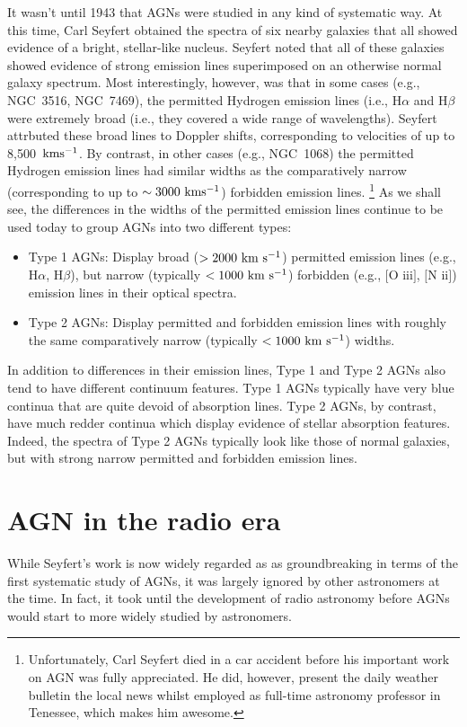 \documentclass[11pt]{article}
\begin{document}
It wasn't until 1943 that AGNs were studied in any kind of systematic
way. At this time, Carl Seyfert obtained the spectra of six nearby
galaxies that all showed evidence of a bright, stellar-like
nucleus. Seyfert noted that all of these galaxies showed evidence of
strong emission lines superimposed on an otherwise normal galaxy
spectrum. Most interestingly, however, was that in some cases (e.g.,
NGC~3516, NGC~7469), the permitted Hydrogen emission lines (i.e.,
H$\alpha$ and H$\beta$ were extremely broad (i.e., they covered a wide
range of wavelengths). Seyfert attrbuted these broad lines to Doppler
shifts, corresponding to velocities of up to 8,500~${\rm km s^{-1}}$.
By contrast, in other cases (e.g., NGC~1068) the permitted Hydrogen
emission lines had similar widths as the comparatively narrow
(corresponding to up to $\sim3000~{\rm km s^{-1}}$) forbidden emission
lines. \footnote{Unfortunately, Carl Seyfert died in a car accident
  before his important work on AGN was fully appreciated. He did,
  however, present the daily weather bulletin the local news whilst
  employed as full-time astronomy professor in Tenessee, which makes
  him awesome.}  As we shall see, the differences in the widths of the
permitted emission lines continue to be used today to group AGNs into
two different types:
\begin{itemize}
\item Type 1 AGNs: Display broad ($>2000~{\rm km~s^{-1}}$) permitted
  emission lines (e.g., H$\alpha$, H$\beta$), but narrow (typically
  $<1000~{\rm km~s^{-1}}$) forbidden (e.g., $[$O {\sc iii}$]$, $[$N
  {\sc ii}$]$) emission lines in their optical spectra.
\item Type 2 AGNs: Display permitted and forbidden emission lines with
  roughly the same comparatively narrow (typically
  $<1000~{\rm km~s^{-1}}$) widths.
\end{itemize}

In addition to differences in their emission lines, Type 1 and Type 2
AGNs also tend to have different continuum features. Type 1 AGNs
typically have very blue continua that are quite devoid of absorption
lines. Type 2 AGNs, by contrast, have much redder continua which
display evidence of stellar absorption features. Indeed, the spectra
of Type 2 AGNs typically look like those of normal galaxies, but with
strong narrow permitted and forbidden emission lines.

\section{AGN in the radio era}
While Seyfert's work is now widely regarded as as groundbreaking in
terms of the first systematic study of AGNs, it was largely ignored by
other astronomers at the time. In fact, it took until the development
of radio astronomy before AGNs would start to more widely studied by
astronomers.
\end{document}

